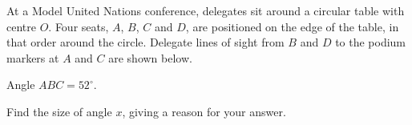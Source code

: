 \begin{question}
\noindent At a Model United Nations conference, delegates sit around a circular table with centre $O$. Four seats, $A$, $B$, $C$ and $D$, are positioned on the edge of the table, in that order around the circle. Delegate lines of sight from $B$ and $D$ to the podium markers at $A$ and $C$ are shown below.

\begin{center}
\end{center}

\noindent Angle $ABC = 52^\circ$.

\noindent Find the size of angle $x$, giving a reason for your answer.

\vspace{4cm}

\begin{flushright}
\end{flushright}
\end{question}
